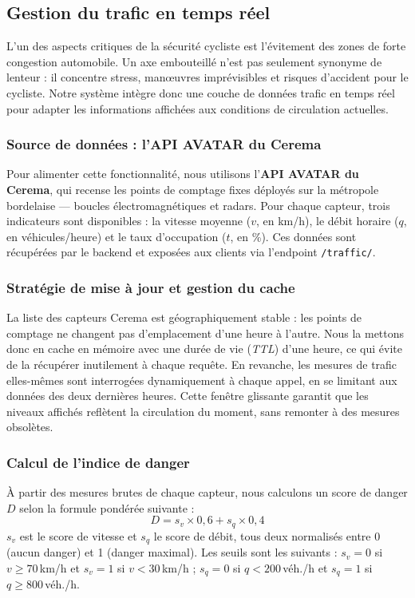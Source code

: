 \subsection{Gestion du trafic en temps réel}

L'un des aspects critiques de la sécurité cycliste est l'évitement des zones de forte congestion automobile. Un axe embouteillé n'est pas seulement synonyme de lenteur : il concentre stress, manœuvres imprévisibles et risques d'accident pour le cycliste. Notre système intègre donc une couche de données trafic en temps réel pour adapter les informations affichées aux conditions de circulation actuelles.

\subsubsection{Source de données : l'API AVATAR du Cerema}

Pour alimenter cette fonctionnalité, nous utilisons l'\textbf{API AVATAR du Cerema}, qui recense les points de comptage fixes déployés sur la métropole bordelaise — boucles électromagnétiques et radars. Pour chaque capteur, trois indicateurs sont disponibles : la vitesse moyenne ($v$, en km/h), le débit horaire ($q$, en véhicules/heure) et le taux d'occupation ($t$, en \%). Ces données sont récupérées par le backend et exposées aux clients via l'endpoint \texttt{/traffic/}.

\subsubsection{Stratégie de mise à jour et gestion du cache}

La liste des capteurs Cerema est géographiquement stable : les points de comptage ne changent pas d'emplacement d'une heure à l'autre. Nous la mettons donc en cache en mémoire avec une durée de vie (\textit{TTL}) d'une heure, ce qui évite de la récupérer inutilement à chaque requête. En revanche, les mesures de trafic elles-mêmes sont interrogées dynamiquement à chaque appel, en se limitant aux données des deux dernières heures. Cette fenêtre glissante garantit que les niveaux affichés reflètent la circulation du moment, sans remonter à des mesures obsolètes.

\subsubsection{Calcul de l'indice de danger}

À partir des mesures brutes de chaque capteur, nous calculons un score de danger $D$ selon la formule pondérée suivante :
\begin{equation}
    D = s_v \times 0{,}6 + s_q \times 0{,}4
\end{equation}
$s_v$ est le score de vitesse et $s_q$ le score de débit, tous deux normalisés entre 0 (aucun danger) et 1 (danger maximal). Les seuils sont les suivants : $s_v = 0$ si $v \geq 70$\,km/h et $s_v = 1$ si $v < 30$\,km/h ; $s_q = 0$ si $q < 200$\,véh./h et $s_q = 1$ si $q \geq 800$\,véh./h.

